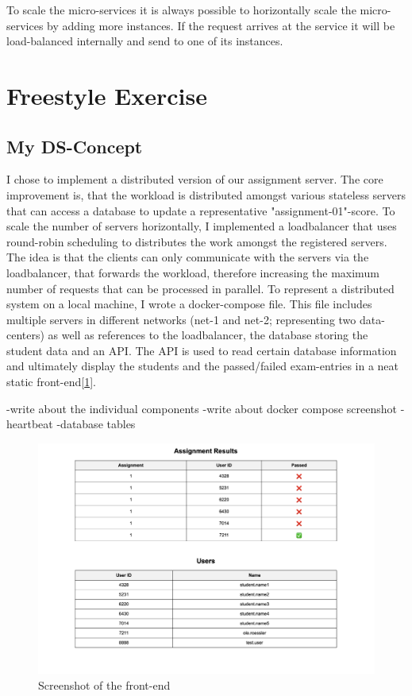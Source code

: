 \documentclass{article}
\begin{document}
To scale the micro-services it is always possible to horizontally scale the micro-services by adding more instances. If the request arrives at the service it will be load-balanced internally and send to one of its instances.


\section{Freestyle Exercise}
\subsection{My DS-Concept}
I chose to implement a distributed version of our assignment server. 
The core improvement is, that the workload is distributed amongst various stateless servers that can access a database to update a representative "assignment-01"-score. To scale the number of servers horizontally, I implemented a loadbalancer that uses round-robin scheduling to distributes the work amongst the registered servers. The idea is that the clients can only communicate with the servers via the loadbalancer, that forwards the workload, therefore increasing the maximum number of requests that can be processed in parallel. 
To represent a distributed system on a local machine, I wrote a docker-compose file. This file includes multiple servers in different networks (net-1 and net-2; representing two data-centers) as well as references to the loadbalancer, the database storing the student data and an API. The API is used to read certain database information and ultimately display the students and the passed/failed exam-entries in a neat static front-end[\ref{fig:frontend}].


-write about the individual components 
-write about docker compose screenshot
-heartbeat
-database tables 

\begin{figure}
    \centering
    \includegraphics[width=1\linewidth]{images/frontend_screenshot.png}
    \caption{Screenshot of the front-end}
    \label{fig:frontend}
\end{figure}
\end{document}
